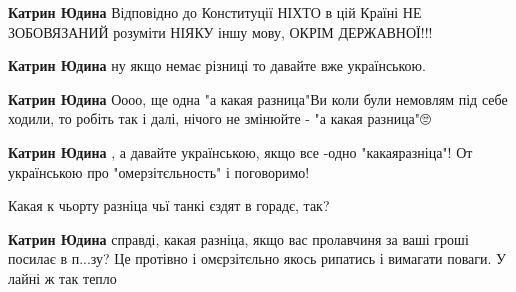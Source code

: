 \begin{itemize}
\begin{itemize}
 
\textbf{Катрин Юдина} Відповідно до Конституції НІХТО в цій Країні НЕ ЗОБОВЯЗАНИЙ розуміти НІЯКУ іншу мову, ОКРІМ ДЕРЖАВНОЇ!!!

 
\textbf{Катрин Юдина} ну якщо немає різниці то давайте вже українською.

 
\textbf{Катрин Юдина} Оооо, ще одна "а какая разница"\Laughey[1.0][white] Ви коли були немовлям під себе ходили, то робіть так і далі, нічого не змінюйте - "а какая разница"🙄

 
\textbf{Катрин Юдина} , а давайте українською, якщо все -одно "какаяразніца"! От українською про "омерзітєльность" і поговоримо!

 
Какая к чьорту разніца чьї танкі єздят в горадє, так?

 
\textbf{Катрин Юдина} справді, какая разніца, якщо вас пролавчиня за ваші гроші
посилає в п...зу? Це протівно і омєрзітєльно якось рипатись і вимагати поваги.
У лайні ж так тепло


\end{itemize}
\end{itemize}
